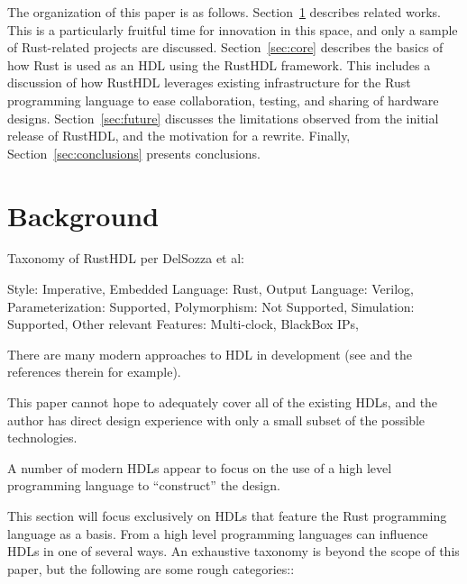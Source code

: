 \documentclass[conference]{IEEEtran}
\begin{document}
The organization of this paper is as follows.  Section~\ref{sec:related} describes related
works.  This is a particularly fruitful time for innovation in this space, and only a
sample of Rust-related projects are discussed. Section~\ref{sec:core} describes the 
basics of how Rust is used as an HDL using the RustHDL
framework.  This includes a discussion of how RustHDL leverages existing infrastructure 
for the Rust programming language to ease collaboration, testing, and sharing of hardware 
designs.  Section~\ref{sec:future} discusses the limitations observed from the initial
release of RustHDL, and the motivation for a rewrite.  Finally, Section~\ref{sec:conclusions}
presents conclusions.

\section{Background}\label{sec:related}

Taxonomy of RustHDL per DelSozza et al:

Style: Imperative,
Embedded Language: Rust,
Output Language: Verilog,
Parameterization: Supported,
Polymorphism: Not Supported,
Simulation: Supported,
Other relevant Features: Multi-clock, BlackBox IPs, 



There are many modern approaches to HDL in development (see \cite{b1} and the references therein 
for example).  

This paper cannot hope to adequately cover all of the existing HDLs, and the author
has direct design experience with only a small subset of the possible technologies.  

A number of
modern HDLs appear to focus on the use of a high level programming language to ``construct'' the
design.  



This section will focus exclusively on HDLs that feature the Rust programming language as a basis.
From a high level programming languages can influence HDLs in one of several ways.  An exhaustive 
taxonomy is beyond the scope of this paper, but the following are some rough categories::
\end{document}

